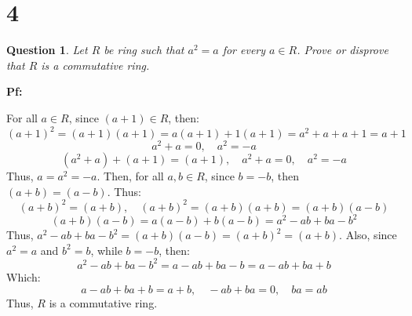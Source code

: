 \documentclass{article}
\newtheorem{question}{Question}
\begin{document}
\break

\section*{4}
\begin{question}
    Let $R$ be ring such that $a^2=a$ for every $a\in R$. Prove or disprove that $R$ is a
commutative ring.
\end{question}

\textbf{Pf:}

For all $a\in R$, since $(a+1)\in R$, then:
$$(a+1)^2=(a+1)(a+1)=a(a+1)+1(a+1)=a^2+a+a+1 = a+1$$
$$a^2+a=0,\quad a^2=-a$$
$$(a^2+a)+(a+1)=(a+1),\quad a^2+a=0,\quad a^2=-a$$
Thus, $a=a^2=-a$. Then, for all $a,b\in R$, since $b=-b$, then $(a+b) = (a-b)$. Thus:
$$(a+b)^2 = (a+b),\quad (a+b)^2=(a+b)(a+b)=(a+b)(a-b)$$
$$(a+b)(a-b)=a(a-b)+b(a-b)=a^2-ab+ba-b^2$$
Thus, $a^2-ab+ba-b^2 = (a+b)(a-b)=(a+b)^2=(a+b)$. Also, since $a^2=a$ and $b^2=b$, while $b=-b$, then:
$$a^2-ab+ba-b^2 = a-ab+ba-b = a-ab+ba+b$$
Which:
$$a-ab+ba+b=a+b,\quad -ab+ba=0,\quad ba=ab$$
Thus, $R$ is a commutative ring.
\end{document}
